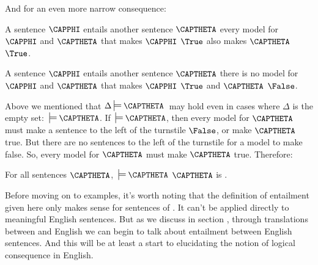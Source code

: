\noindent{}And for an even more narrow consequence:

\begin{cenumerate}
\item A sentence $\CAPPHI$ {entails} another sentence $\CAPTHETA$ \Iff every model for $\CAPPHI$ and $\CAPTHETA$ that makes $\CAPPHI$ $\True$ also makes $\CAPTHETA$ $\True$.
\item A sentence $\CAPPHI$ {entails} another sentence $\CAPTHETA$ \Iff there is no model for $\CAPPHI$ and $\CAPTHETA$ that makes $\CAPPHI$ $\True$ and $\CAPTHETA$ $\False$.
\end{cenumerate}


\noindent{}Above we mentioned that \:$\Delta\sdtstile{}{}\CAPTHETA\:$ may hold even in cases where $\Delta$ is the empty set: $\:\sdtstile{}{}\CAPTHETA$.  If $\:\sdtstile{}{}\CAPTHETA$, then every model for $\CAPTHETA$ must make a sentence to the left of the turnstile $\False$, or make $\CAPTHETA$ true. 
But there are no sentences to the left of the turnstile for a model to make false. 
So, every model for $\CAPTHETA$ must make $\CAPTHETA$ true. 
Therefore:
\begin{THEOREM}{}
For all \GSL{} sentences $\CAPTHETA$, $\:\sdtstile{}{}\CAPTHETA$ \Iff $\CAPTHETA$ is .
\end{THEOREM} 
\noindent{}Before moving on to examples, it's worth noting that the definition of entailment given here only makes sense for sentences of \GSL{}.
It can't be applied directly to meaningful English sentences. 
But as we discuss in section , through translations between \GSL{} and English we can begin to talk about entailment between English sentences. 
And this will be at least a start to elucidating the notion of logical consequence in English.

